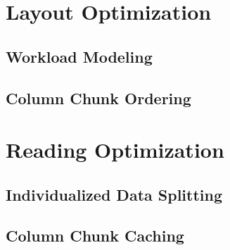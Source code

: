 \section{Layout Optimization}
\label{sec:layout-optimization}

\subsection{Workload Modeling}
\label{subsec:workload-modeling}


\subsection{Column Chunk Ordering}
\label{subsec:column-chunk-ordering}


\section{Reading Optimization}
\label{sec:reading-optimization}


\subsection{Individualized Data Splitting}
\label{subsec:data-splitting}

\subsection{Column Chunk Caching}
\label{subsec:chunk-caching}
